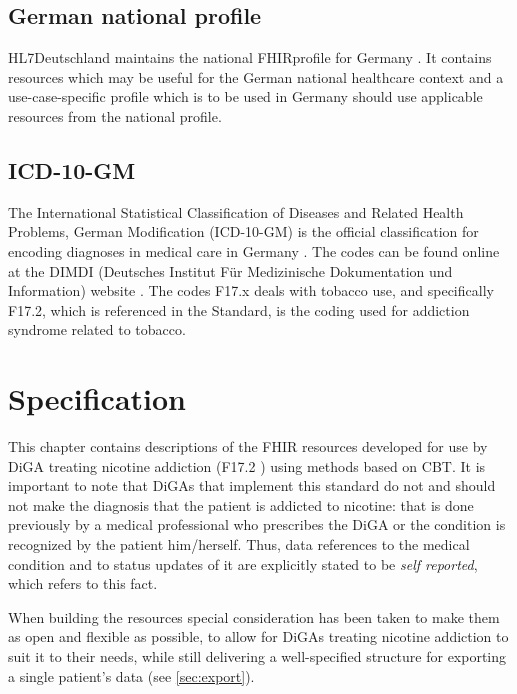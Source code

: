\documentclass[12px]{report}
\newcommand{\fhir}{FHIR\textsuperscript{\textregistered}}
\newcommand{\hl}{HL7\textsuperscript{\textregistered}}
\begin{document}
\section{German national profile}
\hl Deutschland \cite{hlde} maintains the national \fhir profile for Germany \cite{debasis}. It contains resources which may be useful for the German national healthcare context and a use-case-specific profile which is to be used in Germany should use applicable resources from the national profile.

\section{ICD-10-GM}

The International Statistical Classification of Diseases and Related Health Problems, German Modification (ICD-10-GM) is the official classification for encoding diagnoses in medical care in Germany \cite{icd}.
The codes can be found online at the DIMDI (Deutsches Institut Für Medizinische Dokumentation und Information) website \cite{dimdi}. The codes F17.x deals with tobacco use, and specifically F17.2, which is referenced in the Standard,
is the coding used for addiction syndrome related to tobacco.


\chapter{Specification}
\label{ch:spec}

This chapter contains descriptions of the FHIR resources developed for use by DiGA treating nicotine addiction (F17.2 \cite{dimdi}) using methods based on CBT. It is important to note that DiGAs that implement this standard do not and should not
make the diagnosis that the patient is addicted to nicotine: that is done previously by a medical professional who prescribes the DiGA or the condition is recognized by the patient him/herself.
Thus, data references to the medical condition and to status updates of it are explicitly stated to be \textit{self reported}, which refers to this fact.

When building the resources special consideration has been taken to make them as open and flexible as possible, to allow for DiGAs treating nicotine addiction to suit it to their needs, while still delivering a
well-specified structure for exporting a single patient's data (see \ref{sec:export}).
\end{document}
